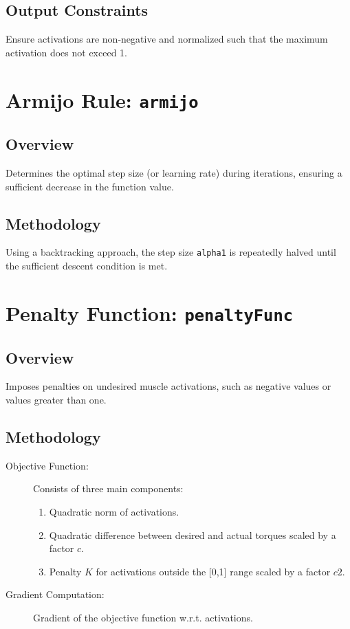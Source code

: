 \subsection{Output Constraints}
Ensure activations are non-negative and normalized such that the maximum activation does not exceed 1.

\section{Armijo Rule: \texttt{armijo}}

\subsection{Overview}
Determines the optimal step size (or learning rate) during iterations, ensuring a sufficient decrease in the function value.

\subsection{Methodology}
Using a backtracking approach, the step size \texttt{alpha1} is repeatedly halved until the sufficient descent condition is met.

\section{Penalty Function: \texttt{penaltyFunc}}

\subsection{Overview}
Imposes penalties on undesired muscle activations, such as negative values or values greater than one.

\subsection{Methodology}
\begin{description}
    \item[Objective Function:] Consists of three main components:
    \begin{enumerate}
        \item Quadratic norm of activations.
        \item Quadratic difference between desired and actual torques scaled by a factor \( c \).
        \item Penalty \( K \) for activations outside the [0,1] range scaled by a factor \( c2 \).
    \end{enumerate}
    \item[Gradient Computation:] Gradient of the objective function w.r.t. activations.
\end{description}

